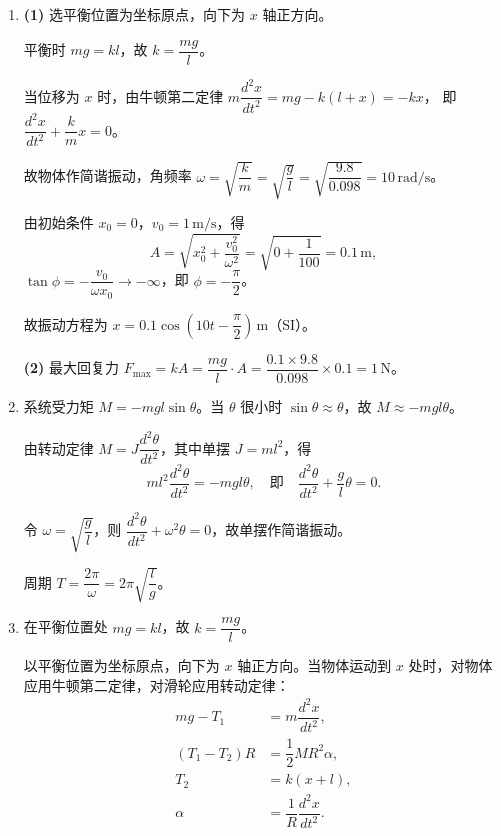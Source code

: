 \documentclass{article}
\begin{document}
\begin{enumerate}
由 $t=0$ 时 $x_0=-3\,\mathrm{cm}$，得 $-3=6\cos\phi$，即 $\cos\phi=-\dfrac{1}{2}$，故 $\phi=\dfrac{2\pi}{3}$ 或 $\dfrac{4\pi}{3}$。由 $v_0>0$ 取 $\phi=\dfrac{4\pi}{3}$。

再由 $t=1.5\,\mathrm{s}$ 时 $x=3\,\mathrm{cm}$，得 $3=6\cos\left(\omega\times 1.5+\dfrac{4\pi}{3}\right)$，即 $\omega\times 1.5+\dfrac{4\pi}{3}=\dfrac{5\pi}{3}$（由 $v>0$ 取此支）。

解得 $\omega=\dfrac{2\pi}{9}\,\mathrm{rad/s}$。

故振动方程为 $x=6\cos\left(\dfrac{2\pi}{9}t-\dfrac{4\pi}{3}\right)\,\mathrm{cm}$。

\item \textbf{(1)} 选平衡位置为坐标原点，向下为 $x$ 轴正方向。

平衡时 $mg=kl$，故 $k=\dfrac{mg}{l}$。

当位移为 $x$ 时，由牛顿第二定律 $m\dfrac{d^2x}{dt^2}=mg-k(l+x)=-kx$，
即 $\dfrac{d^2x}{dt^2}+\dfrac{k}{m}x=0$。

故物体作简谐振动，角频率 $\omega=\sqrt{\dfrac{k}{m}}=\sqrt{\dfrac{g}{l}}=\sqrt{\dfrac{9.8}{0.098}}=10\,\mathrm{rad/s}$。

由初始条件 $x_0=0$，$v_0=1\,\mathrm{m/s}$，得
\[
A=\sqrt{x_0^2+\dfrac{v_0^2}{\omega^2}}=\sqrt{0+\dfrac{1}{100}}=0.1\,\mathrm{m},
\]
$\tan\phi=-\dfrac{v_0}{\omega x_0}\to-\infty$，即 $\phi=-\dfrac{\pi}{2}$。

故振动方程为 $x=0.1\cos\left(10t-\dfrac{\pi}{2}\right)\,\mathrm{m}$（SI）。

\textbf{(2)} 最大回复力 $F_{\max}=kA=\dfrac{mg}{l}\cdot A=\dfrac{0.1\times 9.8}{0.098}\times 0.1=1\,\mathrm{N}$。

\item 系统受力矩 $M=-mgl\sin\theta$。当 $\theta$ 很小时 $\sin\theta\approx\theta$，故 $M\approx -mgl\theta$。

由转动定律 $M=J\dfrac{d^2\theta}{dt^2}$，其中单摆 $J=ml^2$，得
\[
ml^2\dfrac{d^2\theta}{dt^2}=-mgl\theta,\quad \text{即}\quad \dfrac{d^2\theta}{dt^2}+\dfrac{g}{l}\theta=0.
\]

令 $\omega=\sqrt{\dfrac{g}{l}}$，则 $\dfrac{d^2\theta}{dt^2}+\omega^2\theta=0$，故单摆作简谐振动。

周期 $T=\dfrac{2\pi}{\omega}=2\pi\sqrt{\dfrac{l}{g}}$。

\item 在平衡位置处 $mg=kl$，故 $k=\dfrac{mg}{l}$。

以平衡位置为坐标原点，向下为 $x$ 轴正方向。当物体运动到 $x$ 处时，对物体应用牛顿第二定律，对滑轮应用转动定律：
\begin{align*}
mg - T_1 &= m\dfrac{d^2x}{dt^2},\\
(T_1 - T_2)R &= \dfrac{1}{2}MR^2\alpha,\\
T_2 &= k(x+l),\\
\alpha &= \dfrac{1}{R}\dfrac{d^2x}{dt^2}.
\end{align*}


\end{enumerate}
\end{document}
